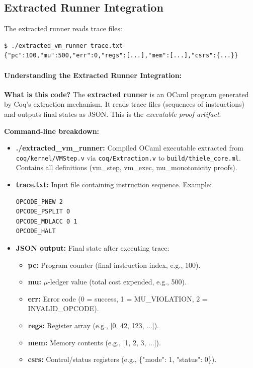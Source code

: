 \subsection{Extracted Runner Integration}

The extracted runner reads trace files:
\begin{lstlisting}
$ ./extracted_vm_runner trace.txt
{"pc":100,"mu":500,"err":0,"regs":[...],"mem":[...],"csrs":{...}}
\end{lstlisting}

\paragraph{Understanding the Extracted Runner Integration:}

\textbf{What is this code?} The \textbf{extracted runner} is an OCaml program generated by Coq's extraction mechanism. It reads trace files (sequences of instructions) and outputs final states as JSON. This is the \textit{executable proof artifact}.

\textbf{Command-line breakdown:}
\begin{itemize}
    \item \textbf{./extracted\_vm\_runner:} Compiled OCaml executable extracted from \texttt{coq/kernel/VMStep.v} via \texttt{coq/Extraction.v} to \texttt{build/thiele\_core.ml}. Contains all definitions (vm\_step, vm\_exec, mu\_monotonicity proofs).
    
    \item \textbf{trace.txt:} Input file containing instruction sequence. Example:
    \begin{verbatim}
OPCODE_PNEW 2
OPCODE_PSPLIT 0
OPCODE_MDLACC 0 1
OPCODE_HALT
\end{verbatim}
    
    \item \textbf{JSON output:} Final state after executing trace:
    \begin{itemize}
        \item \textbf{pc:} Program counter (final instruction index, e.g., 100).
        \item \textbf{mu:} $\mu$-ledger value (total cost expended, e.g., 500).
        \item \textbf{err:} Error code (0 = success, 1 = MU\_VIOLATION, 2 = INVALID\_OPCODE).
        \item \textbf{regs:} Register array (e.g., [0, 42, 123, ...]).
        \item \textbf{mem:} Memory contents (e.g., [1, 2, 3, ...]).
        \item \textbf{csrs:} Control/status registers (e.g., \{"mode": 1, "status": 0\}).
    \end{itemize}
\end{itemize}

